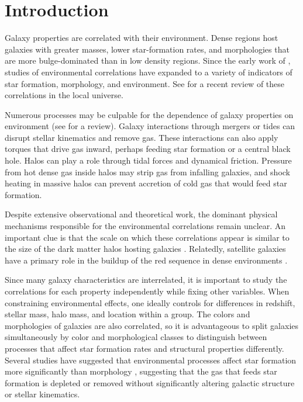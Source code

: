 \documentclass[12pt]{emulateapj}
\begin{document}
\section{Introduction}

Galaxy properties are correlated with their environment. Dense regions
host galaxies with greater masses, lower star-formation rates, and
morphologies that are more bulge-dominated than in low density
regions.  Since the early work of \citet{Dressler1980}, studies of
environmental correlations have expanded to a variety of indicators of
star formation, morphology, and environment. See \citet{Blanton2009}
for a recent review of these correlations in the local universe.

Numerous processes may be culpable for the dependence of galaxy
properties on environment (see \citealt{Boselli2006} for a
review). Galaxy interactions through mergers or tides can disrupt
stellar kinematics and remove gas. These interactions can also apply
torques that drive gas inward, perhaps feeding star formation or a
central black hole. Halos can play a role through tidal forces
and dynamical friction. Pressure from hot dense gas inside halos
may strip gas from infalling galaxies, and shock heating
in massive halos can prevent accretion of cold gas that would feed
star formation.
 
Despite extensive observational and theoretical work, the dominant
physical mechanisms responsible for the environmental correlations
remain unclear.  An important clue is that the scale on which these
correlations appear is similar to the size of the dark matter halos
hosting galaxies \citep[e.g.,][]{Kauffmann2004,
  Blanton2007}. Relatedly, satellite galaxies have a primary role in
the buildup of the red sequence in dense environments
\citep[e.g.,][]{Weinmann2006, vandenBosch2008, Wetzel2012a, Peng2012}.  

Since many galaxy characteristics are interrelated, it is important to
study the correlations for each property independently while fixing
other variables. When constraining environmental effects, one ideally
controls for differences in redshift, stellar mass, halo mass, and
location within a group. The colors and morphologies of galaxies are
also correlated, so it is advantageous to split galaxies
simultaneously by color and morphological classes to distinguish
between processes that affect star formation rates and structural
properties differently. Several studies have suggested that
environmental processes affect star formation more significantly than
morphology \citep[e.g.,][]{Kauffmann2004, Blanton2005, Christlein2005,
  Weinmann2009, Kovac2010b},
suggesting that the gas that feeds star formation is depleted or
removed without significantly altering galactic structure or stellar
kinematics.
\end{document}
